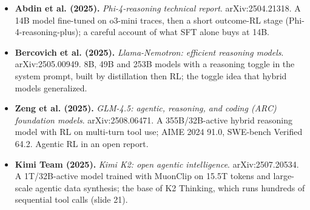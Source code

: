\begin{itemize}[leftmargin=1.2em,itemsep=3pt]
\item \textbf{Abdin et al. (2025).} \textit{Phi-4-reasoning technical report}. arXiv:2504.21318. A 14B model fine-tuned on o3-mini traces, then a short outcome-RL stage (Phi-4-reasoning-plus); a careful account of what SFT alone buys at 14B.
\item \textbf{Bercovich et al. (2025).} \textit{Llama-Nemotron: efficient reasoning models}. arXiv:2505.00949. 8B, 49B and 253B models with a reasoning toggle in the system prompt, built by distillation then RL; the toggle idea that hybrid models generalized.
\item \textbf{Zeng et al. (2025).} \textit{GLM-4.5: agentic, reasoning, and coding (ARC) foundation models}. arXiv:2508.06471. A 355B/32B-active hybrid reasoning model with RL on multi-turn tool use; AIME 2024 91.0, SWE-bench Verified 64.2. Agentic RL in an open report.
\item \textbf{Kimi Team (2025).} \textit{Kimi K2: open agentic intelligence}. arXiv:2507.20534. A 1T/32B-active model trained with MuonClip on 15.5T tokens and large-scale agentic data synthesis; the base of K2 Thinking, which runs hundreds of sequential tool calls (slide 21).
\end{itemize}
